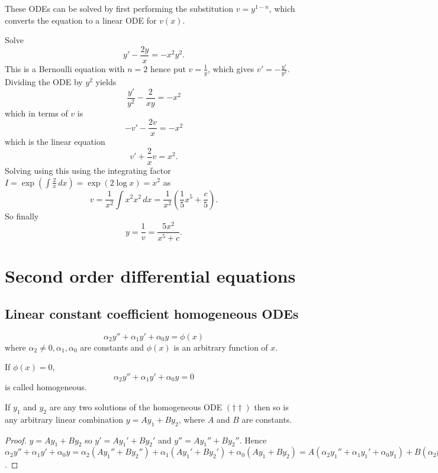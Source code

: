 \documentclass[10pt, a4paper]{article}
\begin{document}
These ODEs can be solved by first performing the substitution $v = y ^ {1 - n}$,
which converts the equation to a linear ODE for $v(x)$.
\begin{example}
    Solve
    \[
    y' - \frac{2y}{x} = -x ^ 2y ^ 2.
    \]
    This is a Bernoulli equation with $n = 2$ hence put $v = \frac{1}{y}$,
    which gives $v' = -\frac{y'}{y ^ 2}$.
    Dividing the ODE by $y ^ 2$ yields
    \[
    \frac{y'}{y ^ 2} - \frac{2}{xy} = -x ^ 2
    \]
    which in terms of $v$ is
    \[
    -v' - \frac{2v}{x} = -x ^ 2
    \]
    which is the linear equation
    \[
    v' + \frac{2}{x}v = x ^ 2.
    \]
    Solving using this using the integrating factor $I = \exp\left(\int\frac{2}{x}\,dx\right) = \exp(2\log x) = x ^ 2$ as
    \[
    v = \frac{1}{x ^ 2}\int x ^ 2 x ^ 2\,dx = \frac{1}{x ^ 2}\left(\frac{1}{5}x ^ 5 + \frac{c}{5}\right).
    \]
    So finally
    \[
    y = \frac{1}{v} = \frac{5x ^ 2}{x ^ 5 + c}.
    \]
\end{example}

\newpage

\section{Second order differential equations}

\subsection{Linear constant coefficient homogeneous ODEs}
\begin{equation}\tag{$\dagger$}
    \alpha_2y'' + \alpha_1y' + \alpha_0y = \phi(x)
\end{equation}
where $\alpha_2 \neq 0, \alpha_1, \alpha_0$ are constants and $\phi(x)$ is an arbitrary function of $x$.

If $\phi(x) = 0$,
\begin{equation}\tag{$\dagger\dagger$}
    \alpha_2y'' + \alpha_1y' + \alpha_0y = 0
\end{equation}
is called homogeneous.

If $y_1$ and $y_2$ are any two solutions of the homogeneous ODE $(\dagger\dagger)$ then so is any arbitrary linear combination $y = Ay_1 + By_2$,
where $A$ and $B$ are constants.
\begin{proof}
    $y = Ay_1 + By_2$ so $y' = Ay_1' + By_2'$ and $y'' = Ay_1'' + By_2''$.
    Hence $\alpha_2y'' + \alpha_1y' + \alpha_0y = \alpha_2(Ay_1'' + By_2'') + \alpha_1(Ay_1' + By_2') + \alpha_0(Ay_1 + By_2) = A(\alpha_2y_1'' + \alpha_1y_1' + \alpha_0y_1) + B(\alpha_2y_2'' + \alpha_1y_2' + \alpha_0y_2) = 0 + 0 = 0$.
\end{proof}
\end{document}
